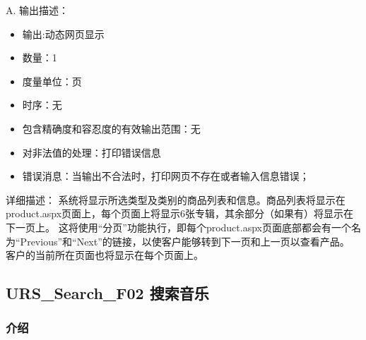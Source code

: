 A. 输出描述：
\begin{itemize}
 \item	输出:动态网页显示
 \item	数量：1
 \item	度量单位：页
 \item	时序：无
 \item	包含精确度和容忍度的有效输出范围：无
 \item	对非法值的处理：打印错误信息
 \item	错误消息：当输出不合法时，打印网页不存在或者输入信息错误；
\end{itemize}
详细描述：
系统将显示所选类型及类别的商品列表和信息。商品列表将显示在product.aspx页面上，每个页面上将显示6张专辑，其余部分（如果有）将显示在下一页上。
这将使用“分页”功能执行，即每个product.aspx页面底部都会有一个名为“Previous”和“Next”的链接，以使客户能够转到下一页和上一页以查看产品。
客户的当前所在页面也将显示在每个页面上。
\subsection{URS\_Search\_F02 搜索音乐}

\subsubsection{介绍}

